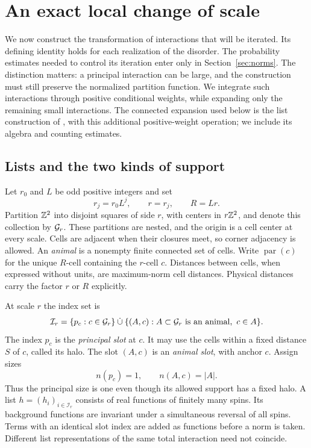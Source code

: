 \section{An exact local change of scale}
\label{sec:blocking}

We now construct the transformation of interactions that will be iterated.
Its defining identity holds for each realization of the disorder.  The
probability estimates needed to control its iteration enter only in
Section~\ref{sec:norms}.  The distinction matters: a principal interaction
can be large, and the construction must still preserve the normalized
partition function.  We integrate such interactions through positive
conditional weights, while expanding only the remaining small interactions.
The connected expansion used below is the list construction of
\cite[Section~5, Proposition~5.2]{ReferenceIsing}, with this additional
positive-weight operation; we include its algebra and counting estimates.

\subsection{Lists and the two kinds of support}

Let $r_0$ and $L$ be odd positive integers and set
\begin{equation}
 r_j=r_0L^j,\qquad r=r_j,\qquad R=Lr.
 \label{block:scales}
\end{equation}
Partition $\mathbb Z^2$ into disjoint squares of side $r$, with centers in
$r\mathbb Z^2$, and denote this collection by $\mathcal G_r$.  These partitions are
nested, and the origin is a cell center at every scale.  Cells are adjacent
when their closures meet, so corner adjacency is allowed.  An
\emph{animal} is a nonempty finite connected set of cells.  Write
$\operatorname{par}(c)$ for the unique $R$-cell containing the $r$-cell $c$.
Distances between cells, when expressed without units, are maximum-norm
cell distances.  Physical distances carry the factor $r$ or $R$ explicitly.

At scale $r$ the index set is
\[
 \mathcal I_r=\{p_c:c\in\mathcal G_r\}
 \mathbin{\dot\cup}
 \{(A,c): A\subset\mathcal G_r\text{ is an animal},\ c\in A\}.
\]
The index $p_c$ is the \emph{principal slot} at $c$.  It may use the cells
within a fixed distance $S$ of $c$, called its halo.  The slot $(A,c)$ is
an \emph{animal slot}, with anchor $c$.  Assign sizes
\[
 n(p_c)=1,\qquad n(A,c)=|A|.
\]
Thus the principal size is one even though its allowed support has a
fixed halo.  A list $h=(h_i)_{i\in\mathcal I_r}$ consists of real functions
of finitely many spins.  Its background functions are invariant under a
simultaneous reversal of all spins.  Terms with an identical slot index
are added as functions before a norm is taken.  Different list
representations of the same total interaction need not coincide.

